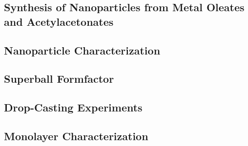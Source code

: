 \documentclass[\main/dresen_thesis.tex]{subfiles}
\renewcommand{\thisPath}{\main/chapters/monolayers/experimentalMethods/}
\begin{document}
  \subsection{Synthesis of  Nanoparticles from Metal Oleates and Acetylacetonates}
    
      \FloatBarrier

  \subsection{Nanoparticle Characterization}
    
      \FloatBarrier

  \subsection{Superball Formfactor}
    
      \FloatBarrier

  \subsection{Drop-Casting Experiments}
    
    \FloatBarrier

  \subsection{Monolayer Characterization}
    \FloatBarrier
\end{document}
